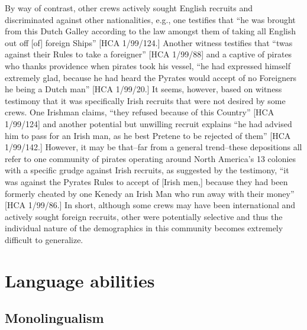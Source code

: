 By way of contrast, other  crews actively sought English recruits and discriminated against other nationalities, e.g., one  testifies that “he was brought from this Dutch Galley according to the law amongst them of taking all English out off [of]   foreign Ships” [HCA 1/99/124.] Another witness testifies that “twas against their Rules to take a foreigner” [HCA 1/99/88] and a captive of pirates who thanks providence when pirates took his vessel, “he had expressed himself extremely glad, because he had heard the Pyrates would accept of no Foreigners he being a Dutch man” [HCA 1/99/20.] It seems, however, based on witness testimony that it was specifically Irish recruits that were not desired by some  crews. One Irishman claims, “they refused because of this Country” [HCA 1/99/124] and another potential but unwilling recruit explains “he had advised him to pass for an Irish man, as he best Pretene to be rejected of them” [HCA 1/99/142.] However, it may be that--far from a general trend--these depositions all refer to one community of pirates operating around North America’s 13 colonies with a specific grudge against Irish recruits, as suggested by the testimony, “it was against the Pyrates Rules to accept of [Irish men,] because they had been formerly cheated by one Kenedy an Irish Man who run away with their money” [HCA 1/99/86.] In short, although some  crews may have been international and actively sought foreign recruits, other were potentially selective and thus the individual nature of the  demographics in this community becomes extremely difficult to generalize.  

\section{{Language abilities} }\label{sec:3.10}

\subsection{{Monolingualism}}\label{sec:3.10.1}

